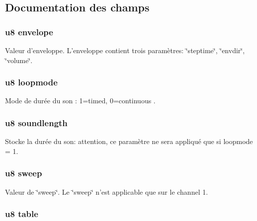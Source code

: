 \subsection{Documentation des champs}
\hypertarget{struct_i_n_s_t_r_u_m_e_n_t_a9e90c973b09de93181dc92b2479499fb}{
\subsubsection[{envelope}]{\setlength{\rightskip}{0pt plus 5cm}u8 {\bf envelope}}}
\label{struct_i_n_s_t_r_u_m_e_n_t_a9e90c973b09de93181dc92b2479499fb}
Valeur d'enveloppe. L'enveloppe contient trois paramètres: \char`\"{}steptime\char`\"{}, \char`\"{}envdir\char`\"{}, \char`\"{}volume\char`\"{}. \hypertarget{struct_i_n_s_t_r_u_m_e_n_t_a8cbe33bff0d7c544428e55850ea1bba9}{
\subsubsection[{loopmode}]{\setlength{\rightskip}{0pt plus 5cm}u8 {\bf loopmode}}}
\label{struct_i_n_s_t_r_u_m_e_n_t_a8cbe33bff0d7c544428e55850ea1bba9}
Mode de durée du son : 1=timed, 0=continuous . \hypertarget{struct_i_n_s_t_r_u_m_e_n_t_a95a669db24a383bd5d83f637e4bc9f0c}{
\subsubsection[{soundlength}]{\setlength{\rightskip}{0pt plus 5cm}u8 {\bf soundlength}}}
\label{struct_i_n_s_t_r_u_m_e_n_t_a95a669db24a383bd5d83f637e4bc9f0c}
Stocke la durée du son: attention, ce paramètre ne sera appliqué que si loopmode = 1. \hypertarget{struct_i_n_s_t_r_u_m_e_n_t_a8631f5f71803aa58cd851af4919cd4be}{
\subsubsection[{sweep}]{\setlength{\rightskip}{0pt plus 5cm}u8 {\bf sweep}}}
\label{struct_i_n_s_t_r_u_m_e_n_t_a8631f5f71803aa58cd851af4919cd4be}
Valeur de \char`\"{}sweep\char`\"{}. Le \char`\"{}sweep\char`\"{} n'est applicable que sur le channel 1. \hypertarget{struct_i_n_s_t_r_u_m_e_n_t_a5a6e736101953ab6b0f9cfc7e7f40a59}{
\subsubsection[{table}]{\setlength{\rightskip}{0pt plus 5cm}u8 {\bf table}}}
